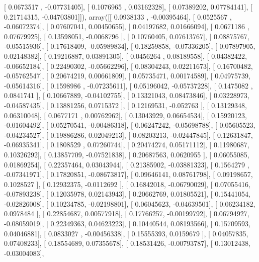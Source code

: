 \documentclass{article}
\begin{document}
       [ 0.0673517 , -0.07731405],
       [ 0.1076965 ,  0.03162328],
       [ 0.07389202,  0.07784141],
       [ 0.21714315, -0.04703801]]), array([[ 0.0938133 , -0.00395464],
       [ 0.0525567 , -0.06072374],
       [ 0.07607041,  0.00450655],
       [ 0.04197682,  0.01666094],
       [ 0.0671186 ,  0.07679925],
       [ 0.13598051, -0.0068796 ],
       [ 0.10760405,  0.07613767],
       [ 0.08875767, -0.05515936],
       [ 0.17618409, -0.05989834],
       [ 0.18259858, -0.07336205],
       [ 0.07897905,  0.02148382],
       [ 0.19216887,  0.03891305],
       [ 0.0456264 ,  0.08189558],
       [ 0.04382422, -0.06652184],
       [ 0.22490302, -0.05662296],
       [ 0.08304243,  0.02211673],
       [ 0.16700482, -0.05762547],
       [ 0.20674219,  0.00661809],
       [ 0.05735471,  0.00174589],
       [ 0.04975739, -0.05614316],
       [ 0.1598986 , -0.07235611],
       [ 0.05196042, -0.05737228],
       [ 0.1475082 ,  0.0841741 ],
       [ 0.10667889, -0.04102755],
       [ 0.13321043,  0.08473846],
       [ 0.03228973, -0.04587435],
       [ 0.13881256,  0.0715372 ],
       [ 0.12169531, -0.052763  ],
       [ 0.13129348,  0.06310048],
       [ 0.0677171 ,  0.00762962],
       [ 0.13043929,  0.06654534],
       [ 0.15920123, -0.01604492],
       [ 0.05270541, -0.00486318],
       [ 0.06247242, -0.05698788],
       [ 0.05605523, -0.04234527],
       [ 0.19886286,  0.02049213],
       [ 0.08203213, -0.02447845],
       [ 0.12631847, -0.06935341],
       [ 0.1808529 ,  0.07260744],
       [ 0.20474274,  0.05171112],
       [ 0.11980687,  0.10326292],
       [ 0.13857709, -0.07521838],
       [ 0.20687563,  0.0620955 ],
       [ 0.06055085,  0.01869254],
       [ 0.22357464,  0.03043944],
       [ 0.21385902, -0.03881323],
       [ 0.1564279 , -0.07341971],
       [ 0.17820851, -0.08673817],
       [ 0.09646141,  0.08761798],
       [ 0.09198657,  0.1028527 ],
       [ 0.12932375, -0.0112692 ],
       [ 0.16842018, -0.06790029],
       [ 0.07055416, -0.07893238],
       [ 0.12035978,  0.02143943],
       [ 0.20662769,  0.01805521],
       [ 0.15441054, -0.02826008],
       [ 0.10234785, -0.02198801],
       [ 0.06045623, -0.04639501],
       [ 0.06234182,  0.0978484 ],
       [ 0.22854687,  0.00577918],
       [ 0.17766257, -0.00199792],
       [ 0.06794927, -0.08059019],
       [ 0.22349363,  0.04623223],
       [ 0.10440544,  0.08193566],
       [ 0.15709593,  0.04046881],
       [ 0.0833027 , -0.00456338],
       [ 0.15555393,  0.0159679 ],
       [ 0.04057835,  0.07408233],
       [ 0.18554689,  0.07355678],
       [ 0.18531426, -0.00793787],
       [ 0.13012438, -0.03004083],
\end{document}
